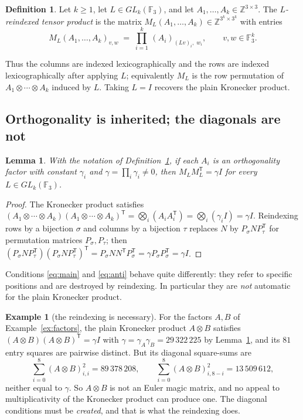 \documentclass[11pt,a4paper]{amsart}
\theoremstyle{plain}
\newtheorem{lemma}[theorem]{Lemma}
\theoremstyle{definition}
\newtheorem{definition}[theorem]{Definition}
\newtheorem{example}[theorem]{Example}
\theoremstyle{remark}
\newcommand{\FF}{\mathbb{F}}
\newcommand{\ZZ}{\mathbb{Z}}
\newcommand{\tr}{\mathsf{T}}
\begin{document}
\begin{definition}\label{def:kronlex}
Let $k\ge1$, let $L\in GL_k(\FF_3)$, and let $A_1,\dots,A_k\in\ZZ^{3\times3}$.
The \emph{$L$-reindexed tensor product} is the matrix
$M_L(A_1,\dots,A_k)\in\ZZ^{3^k\times3^k}$ with entries
\[
M_L(A_1,\dots,A_k)_{v,w}\;=\;\prod_{i=1}^{k}\,(A_i)_{(Lv)_i,\;w_i},
\qquad v,w\in\FF_3^k .
\]
\end{definition}

Thus the columns are indexed lexicographically and the rows are indexed
lexicographically after applying $L$; equivalently $M_L$ is the row permutation
of $A_1\otimes\cdots\otimes A_k$ induced by $L$. Taking $L=I$ recovers the plain
Kronecker product.

\subsection{Orthogonality is inherited; the diagonals are not}

\begin{lemma}\label{lem:orth}
With the notation of Definition~\ref{def:kronlex}, if each $A_i$ is an
orthogonality factor with constant $\gamma_i$ and $\gamma=\prod_i\gamma_i\ne0$,
then $M_LM_L^{\tr}=\gamma I$ for every $L\in GL_k(\FF_3)$.
\end{lemma}

\begin{proof}
The Kronecker product satisfies
$(A_1\otimes\cdots\otimes A_k)(A_1\otimes\cdots\otimes A_k)^{\tr}
=\bigotimes_i (A_iA_i^{\tr})=\bigotimes_i(\gamma_i I)=\gamma I$.
Reindexing rows by a bijection $\sigma$ and columns by a bijection $\tau$
replaces $N$ by $P_\sigma N P_\tau^{\tr}$ for permutation matrices
$P_\sigma,P_\tau$; then
$(P_\sigma NP_\tau^{\tr})(P_\sigma NP_\tau^{\tr})^{\tr}
=P_\sigma NN^{\tr}P_\sigma^{\tr}=\gamma P_\sigma P_\sigma^{\tr}=\gamma I$.
\end{proof}

Conditions \eqref{eq:main} and \eqref{eq:anti} behave quite differently: they
refer to specific positions and are destroyed by reindexing. In particular they
are \emph{not} automatic for the plain Kronecker product.

\begin{example}[the reindexing is necessary]\label{ex:necessary}
For the factors $A,B$ of Example~\ref{ex:factors}, the plain Kronecker product
$A\otimes B$ satisfies $(A\otimes B)(A\otimes B)^{\tr}=\gamma I$ with
$\gamma=\gamma_A\gamma_B=29\,322\,225$ by Lemma~\ref{lem:orth}, and its $81$
entry squares are pairwise distinct. But its diagonal square-sums are
\[
\sum_{i=0}^{8}(A\otimes B)_{i,i}^2=89\,378\,208,
\qquad
\sum_{i=0}^{8}(A\otimes B)_{i,8-i}^2=13\,509\,612,
\]
neither equal to $\gamma$. So $A\otimes B$ is not an Euler magic matrix, and no
appeal to multiplicativity of the Kronecker product can produce one. The
diagonal conditions must be \emph{created}, and that is what the reindexing does.
\end{example}
\end{document}
